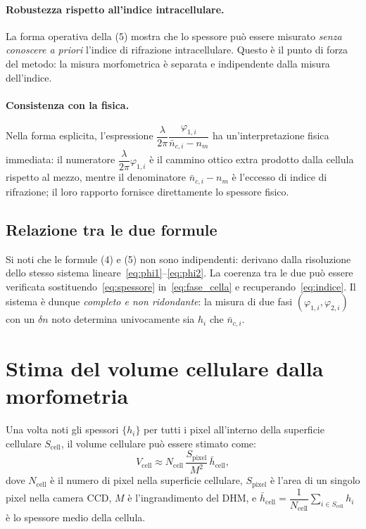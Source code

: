 \paragraph{Robustezza rispetto all'indice intracellulare.}
La forma operativa della (5) mostra che lo spessore può essere misurato
\emph{senza conoscere a priori} l'indice di rifrazione intracellulare. Questo è
il punto di forza del metodo: la misura morfometrica è separata e indipendente
dalla misura dell'indice.

\paragraph{Consistenza con la fisica.}
Nella forma esplicita, l'espressione $\dfrac{\lambda}{2\pi}\dfrac{\varphi_{1,i}}
{\bar{n}_{c,i}-n_m}$ ha un'interpretazione fisica immediata: il numeratore
$\dfrac{\lambda}{2\pi}\varphi_{1,i}$ è il cammino ottico extra prodotto dalla
cellula rispetto al mezzo, mentre il denominatore $\bar{n}_{c,i} - n_m$ è
l'eccesso di indice di rifrazione; il loro rapporto fornisce direttamente
lo spessore fisico.

\subsection{Relazione tra le due formule}

Si noti che le formule (4) e (5) non sono indipendenti: derivano dalla risoluzione
dello stesso sistema lineare~\eqref{eq:phi1}--\eqref{eq:phi2}. La coerenza tra
le due può essere verificata sostituendo~\eqref{eq:spessore}
in~\eqref{eq:fase_cella} e recuperando~\eqref{eq:indice}. Il sistema è dunque
\emph{completo e non ridondante}: la misura di due fasi $(\varphi_{1,i},
\varphi_{2,i})$ con un $\delta n$ noto determina univocamente sia $h_i$ che
$\bar{n}_{c,i}$.

\section{Stima del volume cellulare dalla morfometria}

Una volta noti gli spessori $\{h_i\}$ per tutti i pixel all'interno della superficie
cellulare $S_\mathrm{cell}$, il volume cellulare può essere stimato come:
\[
  V_\mathrm{cell}
  \approx N_\mathrm{cell}\,\frac{S_\mathrm{pixel}}{M^2}\,\bar{h}_\mathrm{cell},
\]
dove $N_\mathrm{cell}$ è il numero di pixel nella superficie cellulare,
$S_\mathrm{pixel}$ è l'area di un singolo pixel nella camera CCD, $M$ è l'ingrandimento
del DHM, e $\bar{h}_\mathrm{cell} = \dfrac{1}{N_\mathrm{cell}}\displaystyle\sum_{i \in S_\mathrm{cell}} h_i$
è lo spessore medio della cellula.

